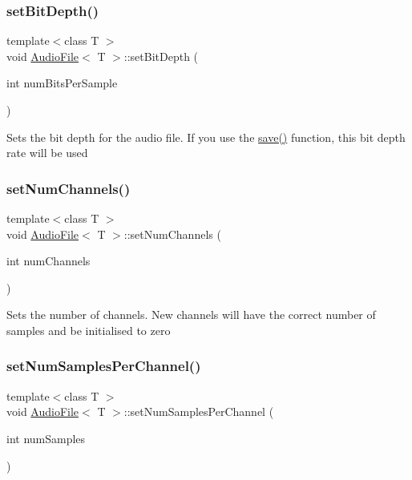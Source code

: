 \subsubsection{\texorpdfstring{set\+Bit\+Depth()}{setBitDepth()}}
{\footnotesize\ttfamily template$<$class T $>$ \\
void \hyperlink{class_audio_file}{Audio\+File}$<$ T $>$\+::set\+Bit\+Depth (\begin{DoxyParamCaption}\item[{int}]{num\+Bits\+Per\+Sample }\end{DoxyParamCaption})}

Sets the bit depth for the audio file. If you use the \hyperlink{class_audio_file_a415239cad5b54b4fef4a210ab79911e3}{save()} function, this bit depth rate will be used \mbox{\label{class_audio_file_a354018a94ae15907d7308782f2adadbb}} 
\subsubsection{\texorpdfstring{set\+Num\+Channels()}{setNumChannels()}}
{\footnotesize\ttfamily template$<$class T $>$ \\
void \hyperlink{class_audio_file}{Audio\+File}$<$ T $>$\+::set\+Num\+Channels (\begin{DoxyParamCaption}\item[{int}]{num\+Channels }\end{DoxyParamCaption})}

Sets the number of channels. New channels will have the correct number of samples and be initialised to zero \mbox{\label{class_audio_file_a4cff9513d49e21d25de13513564784b7}} 
\subsubsection{\texorpdfstring{set\+Num\+Samples\+Per\+Channel()}{setNumSamplesPerChannel()}}
{\footnotesize\ttfamily template$<$class T $>$ \\
void \hyperlink{class_audio_file}{Audio\+File}$<$ T $>$\+::set\+Num\+Samples\+Per\+Channel (\begin{DoxyParamCaption}\item[{int}]{num\+Samples }\end{DoxyParamCaption})}

